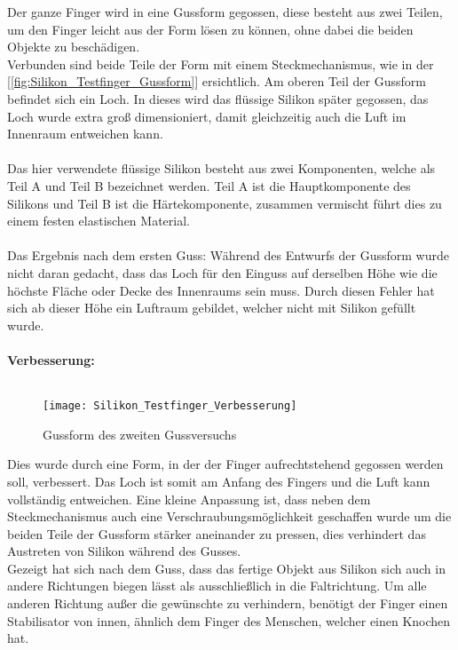 \documentclass[titlepage,12pt,twoside]{article}
\begin{document}
\hfill \break
Der ganze Finger wird in eine Gussform gegossen, diese besteht aus zwei Teilen, um den Finger leicht aus der Form lösen zu können, ohne dabei die beiden Objekte zu beschädigen. \\
Verbunden sind beide Teile der Form mit einem Steckmechanismus, wie in der [\textcolor{blue}{\autoref{fig:Silikon_Testfinger_Gussform}}] ersichtlich. Am oberen Teil der Gussform befindet sich ein Loch. In dieses wird das flüssige Silikon später gegossen, das Loch wurde extra groß 
dimensioniert, damit gleichzeitig auch die Luft im Innenraum entweichen kann. \\
\\
Das hier verwendete flüssige Silikon besteht aus zwei Komponenten, welche als Teil A und Teil B bezeichnet werden. Teil A ist die Hauptkomponente des Silikons und Teil B ist die Härtekomponente, zusammen vermischt führt dies zu einem festen elastischen 
Material. \\
\\
Das Ergebnis nach dem ersten Guss: Während des Entwurfs der Gussform wurde nicht daran gedacht, dass das Loch für den Einguss auf derselben Höhe wie die höchste Fläche oder Decke des Innenraums sein muss. Durch diesen Fehler hat sich ab dieser Höhe 
ein Luftraum gebildet, welcher nicht mit Silikon gefüllt wurde. \\
\\
\newpage
\textbf{Verbesserung:} \\
\\
\begin{figure}[H]
	\begin{center}
		\scalebox{0.8}
		{\texttt{[image: Silikon\_Testfinger\_Verbesserung]}}
		\caption{Gussform des zweiten Gussversuchs}
		\label{fig:Silikon_Testfinger_Verbesserung}			
	\end{center}
\end{figure}
\hfill \break
Dies wurde durch eine Form, in der der Finger aufrechtstehend gegossen werden soll, verbessert. Das Loch ist somit am Anfang des Fingers und die Luft kann vollständig entweichen. Eine kleine Anpassung ist, dass neben dem Steckmechanismus auch eine 
Verschraubungsmöglichkeit geschaffen wurde um die beiden Teile der Gussform stärker aneinander zu pressen, dies verhindert das Austreten von Silikon während des Gusses. \\
Gezeigt hat sich nach dem Guss, dass das fertige Objekt aus Silikon sich auch in andere Richtungen biegen lässt als ausschließlich in die Faltrichtung. Um alle anderen Richtung außer die gewünschte zu verhindern, benötigt der Finger einen 
Stabilisator von innen, ähnlich dem Finger des Menschen, welcher einen Knochen hat. \\
\\
\newpage
\end{document}
